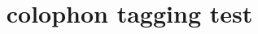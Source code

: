 \documentclass{article}
\title{colophon tagging test}
\begin{document}
\begin{colophon}
\kant[1][1-2]
\kant[2][1-2]
\end{colophon}
\kant[1-2]
\end{document}

